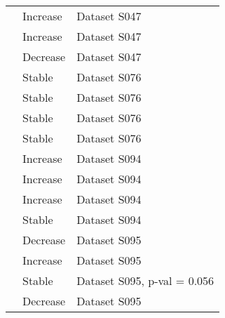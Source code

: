 \documentclass[
  12pt,
  oneside]{report}
\begin{document}
\begin{landscape}
\begin{longtable}[t]{ll>{\raggedright\arraybackslash}p{40em}}
\cite{pilotto_meta-analysis_2020} & Increase & Dataset \vphantom{1} S047\\
\addlinespace
\cite{pilotto_meta-analysis_2020} & Increase & Dataset S047\\
\cite{pilotto_meta-analysis_2020} & Decrease & Dataset S047\\
\cite{pilotto_meta-analysis_2020} & Stable & Dataset \vphantom{3} S076\\
\cite{pilotto_meta-analysis_2020} & Stable & Dataset \vphantom{2} S076\\
\cite{pilotto_meta-analysis_2020} & Stable & Dataset \vphantom{1} S076\\
\addlinespace
\cite{pilotto_meta-analysis_2020} & Stable & Dataset S076\\
\cite{pilotto_meta-analysis_2020} & Increase & Dataset \vphantom{2} S094\\
\cite{pilotto_meta-analysis_2020} & Increase & Dataset \vphantom{1} S094\\
\cite{pilotto_meta-analysis_2020} & Increase & Dataset S094\\
\cite{pilotto_meta-analysis_2020} & Stable & Dataset S094\\
\addlinespace
\cite{pilotto_meta-analysis_2020} & Decrease & Dataset \vphantom{1} S095\\
\cite{pilotto_meta-analysis_2020} & Increase & Dataset S095\\
\cite{pilotto_meta-analysis_2020} & Stable & Dataset S095, p-val = 0.056\\
\cite{pilotto_meta-analysis_2020} & Decrease & Dataset S095\\*
\end{longtable}
\endgroup{}
\end{landscape}

\singlespacing


\renewcommand\bibname{References}
  
\end{document}
